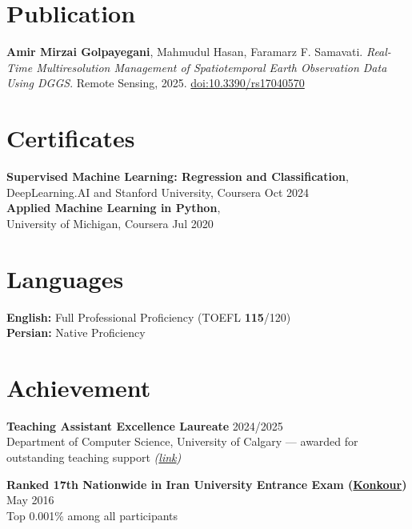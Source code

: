 \documentclass[a4paper,10pt]{article}
\begin{document}
\section*{Publication}

\textbf{Amir Mirzai Golpayegani}, Mahmudul Hasan, Faramarz F. Samavati. 
\textit{Real-Time Multiresolution Management of Spatiotemporal Earth Observation Data Using DGGS}. 
Remote Sensing, 2025. \href{https://doi.org/10.3390/rs17040570}{doi:10.3390/rs17040570}


\section*{Certificates}

\textbf{Supervised Machine Learning: Regression and Classification},\\
DeepLearning.AI and Stanford University, Coursera 
\hfill Oct 2024 \\
\textbf{Applied Machine Learning in Python},\\
University of Michigan, Coursera 
\hfill Jul 2020


\section*{Languages}

\textbf{English:} Full Professional Proficiency (TOEFL \textbf{115}/120) \\
\textbf{Persian:} Native Proficiency

\section*{Achievement}

\textbf{Teaching Assistant Excellence Laureate} \hfill 2024/2025 \\
Department of Computer Science, University of Calgary --- awarded for outstanding teaching support \textit{(\href{https://science.ucalgary.ca/computer-science/about/our-department/ta-recognition-2024-2025}{link})}

\vspace{0.35em}

\textbf{Ranked 17th Nationwide in Iran University Entrance Exam (\href{https://en.wikipedia.org/wiki/Iranian_University_Entrance_Exam}{Konkour})} \hfill May 2016 \\
Top 0.001\% among all participants
\end{document}
